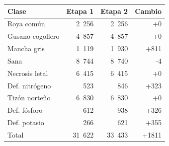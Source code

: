 \begin{tabular}{lrrr}
\toprule
\textbf{Clase} & \textbf{Etapa 1} & \textbf{Etapa 2} & \textbf{Cambio} \\
\midrule
Roya común & 2~256 & 2~256 & +0 \\
Gusano cogollero & 4~857 & 4~857 & +0 \\
Mancha gris & 1~119 & 1~930 & +811 \\
Sana & 8~744 & 8~740 & -4 \\
Necrosis letal & 6~415 & 6~415 & +0 \\
Def. nitrógeno & 523 & 846 & +323 \\
Tizón norteño & 6~830 & 6~830 & +0 \\
Def. fósforo & 612 & 938 & +326 \\
Def. potasio & 266 & 621 & +355 \\
Total & 31~622 & 33~433 & +1811 \\
\bottomrule
\end{tabular}
